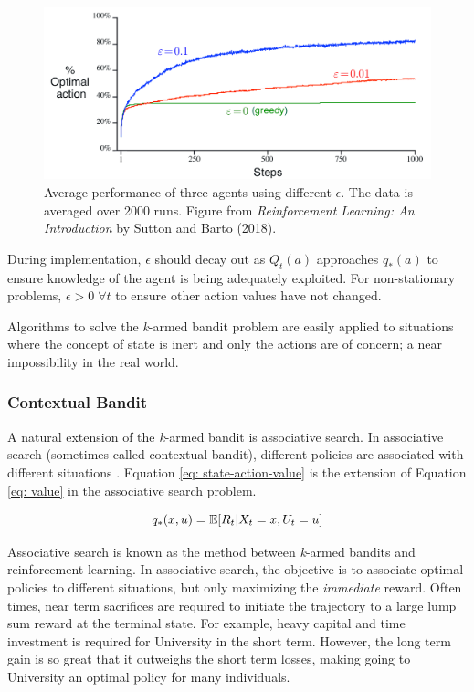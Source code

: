 \begin{figure}[h]
    \centering
    \includegraphics[scale=0.38]{images/eps_vs_optAction.png}
    \caption{Average performance of three agents using different $\epsilon$.  The data is averaged over 2000 runs.  Figure from \textit{Reinforcement Learning: An Introduction} by Sutton and Barto (2018).}
    \label{fig: eps_figure}
\end{figure}

During implementation, $\epsilon$ should decay out as $Q_t(a)$ approaches $q_*(a)$ to ensure knowledge of the agent is being adequately exploited. For non-stationary problems, $\epsilon > 0 \; \forall t$ to ensure other action values have not changed.

Algorithms to solve the \textit{k}-armed bandit problem are easily applied to situations where the concept of state is inert and only the actions are of concern;  a near impossibility in the real world.  

\subsubsection{Contextual Bandit}

A natural extension of the \textit{k}-armed bandit is associative search.  In associative search (sometimes called contextual bandit), different policies are associated with different situations \cite{bartosuttonbrouwer}.  Equation \ref{eq: state-action-value} is the extension of Equation \ref{eq: value} in the associative search problem.

\begin{equation}
    \centering
    q_*(x, u) = \mathbb{E}[R_t | X_t = x, U_t = u]
    \label{eq: state-action-value}
\end{equation}

Associative search is known as the method between \textit{k}-armed bandits and reinforcement learning.  In associative search, the objective is to associate optimal policies to different situations, but only maximizing the \textit{immediate} reward.  Often times, near term sacrifices are required to initiate the trajectory to a large lump sum reward at the terminal state.  For example, heavy capital and time investment is required for University in the short term.  However, the long term gain is so great that it outweighs the short term losses, making going to University an optimal policy for many individuals.

